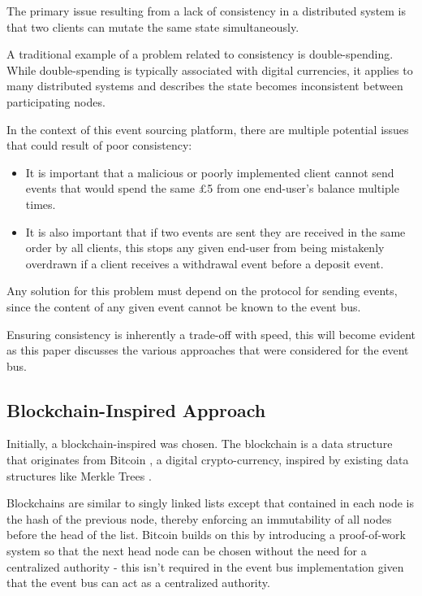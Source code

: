 \documentclass{l3proj}
\begin{document}
The primary issue resulting from a lack of consistency in a distributed system is that two clients can mutate the same state simultaneously.

A traditional example of a problem related to consistency is double-spending. While double-spending is typically associated with digital currencies, it applies to many distributed systems and describes the state becomes inconsistent between participating nodes.

In the context of this event sourcing platform, there are multiple potential issues that could result of poor consistency:

\begin{itemize}
    \item It is important that a malicious or poorly implemented client cannot send events that would spend the same £5 from one end-user's balance multiple times.
    \item It is also important that if two events are sent they are received in the same order by all clients, this stops any given end-user from being mistakenly overdrawn if a client receives a withdrawal event before a deposit event.
\end{itemize}

Any solution for this problem must depend on the protocol for sending events, since the content of any given event cannot be known to the event bus.

Ensuring consistency is inherently a trade-off with speed, this will become evident as this paper discusses the various approaches that were considered for the event bus.

\subsection{Blockchain-Inspired Approach}
Initially, a blockchain-inspired was chosen. The blockchain \cite{blockchain} is a data structure that originates from Bitcoin \cite{bitcoin}, a digital crypto-currency, inspired by existing data structures like Merkle Trees \cite{merkletree}.

Blockchains are similar to singly linked lists except that contained in each node is the hash of the previous node, thereby enforcing an immutability of all nodes before the head of the list. Bitcoin builds on this by introducing a proof-of-work system so that the next head node can be chosen without the need for a centralized authority - this isn't required in the event bus implementation given that the event bus can act as a centralized authority.
\end{document}
